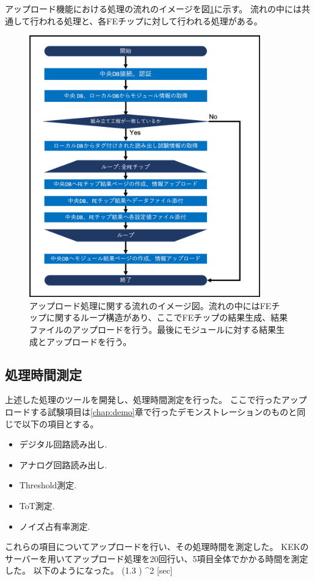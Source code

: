 アップロード機能における処理の流れのイメージを図\ref{upload_algorithm}に示す。
流れの中には共通して行われる処理と、各FEチップに対して行われる処理がある。

\begin{figure}[bpt]\centering
\includegraphics[width=10cm]{./upload_algorithm.png}
\caption[アップロード処理に関する流れのイメージ図]{アップロード処理に関する流れのイメージ図。流れの中にはFEチップに関するループ構造があり、ここでFEチップの結果生成、結果ファイルのアップロードを行う。最後にモジュールに対する結果生成とアップロードを行う。}
\label{upload_algorithm}
\end{figure}

\subsection{処理時間測定}
上述した処理のツールを開発し、処理時間測定を行った。
ここで行ったアップロードする試験項目は\ref{chap:demo}章で行ったデモンストレーションのものと同じで以下の項目とする。
\begin{itemize}
  \item デジタル回路読み出し.
  \item アナログ回路読み出し.
  \item Threshold測定.
  \item ToT測定.
  \item ノイズ占有率測定.
\end{itemize}

これらの項目についてアップロードを行い、その処理時間を測定した。
KEKのサーバーを用いてアップロード処理を20回行い、5項目全体でかかる時間を測定した。
以下のようになった。
\bbb
  \label{func:upload_time_before}
  (1.3 ) ^2 [{\rm sec}]
\eee

